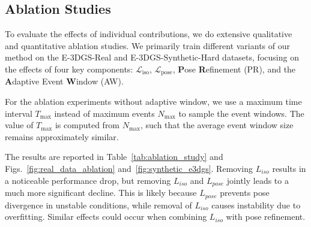 



\subsection{Ablation Studies}

To evaluate the effects of individual contributions, we do extensive qualitative and quantitative ablation studies. 
We primarily train different variants of our method on the E-3DGS-Real and E-3DGS-Synthetic-Hard datasets, focusing on the effects of four key components: $\mathcal{L}_\text{iso}$, $\mathcal{L}_\text{pose}$, \textbf{P}ose \textbf{R}efinement (PR), and the \textbf{A}daptive Event \textbf{W}indow (AW).

For the ablation experiments without adaptive window, we use a maximum time interval $T_\text{max}$ instead of maximum events $N_\text{max}$ to sample the event windows. The value of $T_\text{max}$ is computed from $N_\text{max}$, such that the average event window size remains approximately similar.

The results are reported in Table~\ref{tab:ablation_study} and Figs.~\ref{fig:real_data_ablation} and~\ref{fig:synthetic_e3dgs}.
Removing $L_{iso}$ results in a noticeable performance drop, but removing $L_{iso}$ and $L_{pose}$ jointly leads to a much more significant decline. 
This is likely because $L_{pose}$ prevents pose divergence in unstable conditions, while removal of $L_{iso}$ causes instability due to overfitting. 
Similar effects could occur when combining $L_{iso}$ with pose refinement. 


